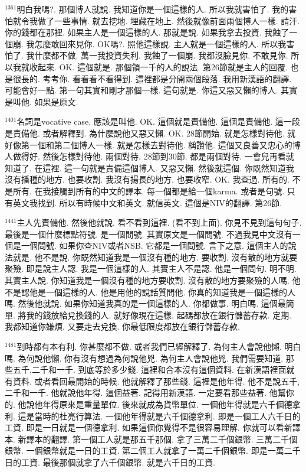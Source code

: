 \documentclass{book}
\begin{document}
$^{1361}$明白我嗎?.
那個博人就說.
我知道你是一個這樣的人.
所以我就害怕了.
我的害怕就令我做了一些事情.
就去挖地.
埋藏在地上.
然後就像前面兩個博人一樣.
請汗.
你的錢都在那裡.
如果主人是一個這樣的人.
那就是說.
如果我拿去投資.
我蝕了一個崩.
我怎麼敢回來見你.
OK嗎?.
照他這樣說.
主人就是一個這樣的人.
所以我害怕了.
我什麼都不做.
萬一我投資失利.
我蝕了一個崩.
我都沒臉見你.
不敢見你.
所以我就收起來.
OK.
這個就是.
那個領一千的人的說法.
第26節就是主人的回覆.
也是很長的.
考考你.
看看看不看得到.
這裡都是分開兩個段落.
我用新漢語的翻譯.
可能會好一點.
第一句其實和剛才那個一樣.
這句就是.
你這又惡又懶的博人.
其實是叫他.
如果是原文.

$^{1401}$名詞是vocative case.
應該是叫他.
OK.
這個就是責備他.
這個是責備他.
這一段是責備他.
或者解釋到.
為什麼說他又惡又懶.
OK.
28節開始.
就是怎樣對待他.
就好像第一個和第二個博人一樣.
就是怎樣去對待他.
稱讚他.
這個又良善又忠心的博人做得好.
然後怎樣對待他.
兩個對待.
28節到30節.
都是兩個對待.
一會兒再看就知道了.
在這裡.
這一句就是責備這個博人.
又惡又懶.
然後就這個.
你既然知道我沒有播種的地方.
也要收割.
我沒有揚長的地方.
也要收窄.
OK.
我查過.
所有的.
不是所有.
在我接觸到所有的中文的譯本.
每一個都是給一個karma.
或者是句號.
只有英文我找到.
所以有時候中文和英文.
就信英文.
這個是NIV的翻譯.
第26節.

$^{1441}$主人先責備他.
然後他就說.
看不看到這裡.
(看不到上面).
你見不見到這句句子.
最後是一個什麼標點符號.
是一個問號.
其實原文是一個問號.
不過我見中文沒有一個是一個問號.
如果你查NIV或者NSB.
它都是一個問號.
言下之意.
這個主人的說法就是.
他不是說.
你既然知道我是一個沒有種的地方.
要收割.
沒有散的地方就要聚殮.
即是說主人認.
我是一個這樣的人.
其實主人不是認.
他是一個問句.
明不明.
其實主人說.
你知道我是一個沒有種的地方要收割.
沒有散的地方要聚殮的人嗎.
他不是認他是一個這樣的人.
他是用他的說話質問他.
你真的知道我是一個這樣的人嗎.
然後他就說.
如果你知道我真的是一個這樣的人.
你都做事.
明白嗎.
這個最簡單.
將我的錢放給兌換錢的人.
就好像現在這樣.
起碼都放在銀行儲蓄存款.
定期.
我都知道你嫌煩.
又要走去兌換.
你最低限度都放在銀行儲蓄存款.

$^{1481}$到時都有本有利.
你甚麼都不做.
或者我們已經解釋了.
為何主人會說他懶.
明白嗎.
為何說他懶.
你有沒有想過為何說他兇.
為何主人會說他兇.
我們需要知道.
那些五千,二千和一千.
到底等於多少錢.
這裡和合本沒有這個資料.
在新漢語裡面就有資料.
或者看回最開始的時候.
他就解釋了那些錢.
這裡是他年得.
他不是說五千,二千和一千.
他就說他年得.
這個益著.
記得用新漢語.
一定要看那些益著.
他幫你的.
他說他年得原來是重量單位.
後來就成為貨幣單位.
一個他年得就是六千個德拿利.
這是當時的杜亮行算法.
一個他年得就是六千個德拿利.
即是一個工人六千日的工資.
即是一日就是一個德拿利.
如果這個你覺得不是很容易理解.
你就可以看新譯本.
新譯本的翻譯.
第一個工人就是那五千那個.
拿了三萬二千個銀幣.
三萬二千個銀幣.
一個銀幣就是一日的工資.
第二個工人就拿了一萬二千個銀幣.
即是一萬二千日的工資.
最後那個就拿了六千個銀幣.
就是六千日的工資.
\end{document}
